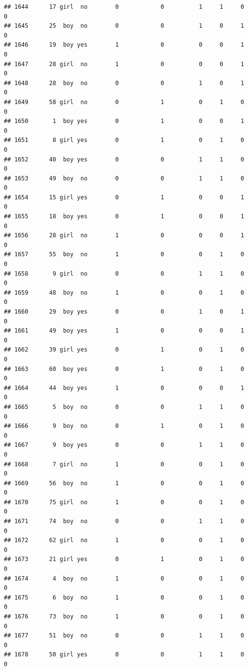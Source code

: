 \documentclass[man]{apa6}
\begin{document}
\begin{verbatim}
## 1644      17 girl  no        0            0          1     1     0     0
## 1645      25  boy  no        0            0          1     0     1     0
## 1646      19  boy yes        1            0          0     0     1     0
## 1647      28 girl  no        1            0          0     0     1     0
## 1648      28  boy  no        0            0          1     0     1     0
## 1649      58 girl  no        0            1          0     1     0     0
## 1650       1  boy yes        0            1          0     0     1     0
## 1651       8 girl yes        0            1          0     1     0     0
## 1652      40  boy yes        0            0          1     1     0     0
## 1653      49  boy  no        0            0          1     1     0     0
## 1654      15 girl yes        0            1          0     0     1     0
## 1655      18  boy yes        0            1          0     0     1     0
## 1656      28 girl  no        1            0          0     0     1     0
## 1657      55  boy  no        1            0          0     1     0     0
## 1658       9 girl  no        0            0          1     1     0     0
## 1659      48  boy  no        1            0          0     1     0     0
## 1660      29  boy yes        0            0          1     0     1     0
## 1661      49  boy yes        1            0          0     0     1     0
## 1662      39 girl yes        0            1          0     1     0     0
## 1663      60  boy yes        0            1          0     1     0     0
## 1664      44  boy yes        1            0          0     0     1     0
## 1665       5  boy  no        0            0          1     1     0     0
## 1666       9  boy  no        0            1          0     1     0     0
## 1667       9  boy yes        0            0          1     1     0     0
## 1668       7 girl  no        1            0          0     1     0     0
## 1669      56  boy  no        1            0          0     1     0     0
## 1670      75 girl  no        1            0          0     1     0     0
## 1671      74  boy  no        0            0          1     1     0     0
## 1672      62 girl  no        1            0          0     1     0     0
## 1673      21 girl yes        0            1          0     1     0     0
## 1674       4  boy  no        1            0          0     1     0     0
## 1675       6  boy  no        1            0          0     1     0     0
## 1676      73  boy  no        1            0          0     1     0     0
## 1677      51  boy  no        0            0          1     1     0     0
## 1678      50 girl yes        0            0          1     1     0     0

\end{verbatim}
\end{document}
